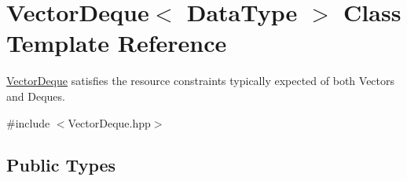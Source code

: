 \hypertarget{classVectorDeque}{\section{Vector\-Deque$<$ Data\-Type $>$ Class Template Reference}
\label{classVectorDeque}
}


{\ttfamily \hyperlink{classVectorDeque}{Vector\-Deque}} satisfies the resource constraints typically expected of both Vectors and Deques.  




{\ttfamily \#include $<$Vector\-Deque.\-hpp$>$}

\subsection*{Public Types}
